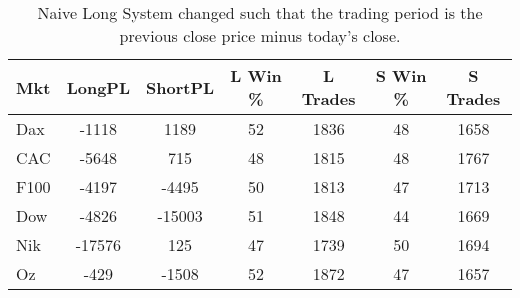 \begin{table}[ht]
\centering
\caption[Naive Long System - Close to Close]{Naive Long System changed such that the trading period is the previous close price minus today's close.} 
\label{tab:mac_roc2_results}
\begin{tabular}{lcccccc}
  \toprule Mkt & LongPL & ShortPL & L Win \% & L Trades & S Win \% & S Trades \\ 
  \midrule Dax & -1118 & 1189 & 52 & 1836 & 48 & 1658 \\ 
  CAC & -5648 & 715 & 48 & 1815 & 48 & 1767 \\ 
  F100 & -4197 & -4495 & 50 & 1813 & 47 & 1713 \\ 
  Dow & -4826 & -15003 & 51 & 1848 & 44 & 1669 \\ 
  Nik & -17576 & 125 & 47 & 1739 & 50 & 1694 \\ 
  Oz & -429 & -1508 & 52 & 1872 & 47 & 1657 \\ 
   \bottomrule \end{tabular}
\end{table}
